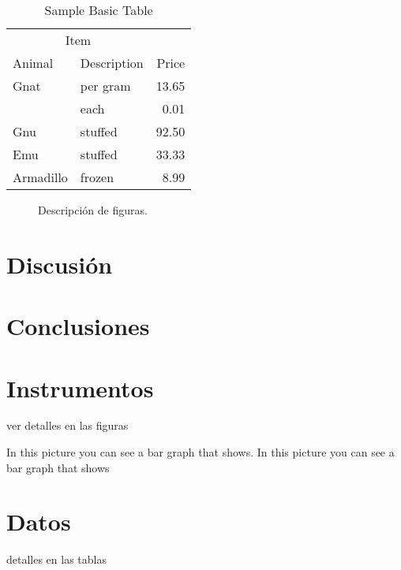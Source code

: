 \documentclass[man, floatsintext]{apa7}
\begin{document}
    \begin{table}[h]
        \caption{Sample Basic Table}
        \label{tab:BasicTable}
        \begin{tabular}{@{}llr@{}}         \toprule
        \multicolumn{2}{c}{Item}        \\ \cmidrule(r){1-2}
        Animal    & Description & Price \\ \midrule
        Gnat      & per gram    & 13.65 \\
        & each        &  0.01 \\
        Gnu       & stuffed     & 92.50 \\
        Emu       & stuffed     & 33.33 \\
        Armadillo & frozen      &  8.99 \\ \bottomrule
        \end{tabular}
    \end{table}

    \begin{figure}
        \caption{Descripción de figuras.}
        \label{fig:Figure1}
    \end{figure}


    \section{Discusión}

    \section{Conclusiones}

    \printbibliography

    \appendix

    \section{Instrumentos}
    \label{Ap. instrumentos}

    ver detalles en las figuras


    In this picture you can see a bar graph that shows. In this picture you can see a bar graph that shows


    \section{Datos}
    \label{Ap.Datos}

    detalles en las tablas
\end{document}
